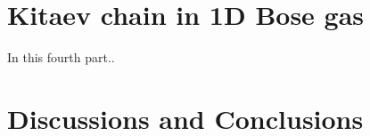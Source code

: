 \documentclass[11pt, twoside]{Thesis}
\begin{document}
 




\part{Kitaev chain in 1D Bose gas}
In this fourth part..
\newpage



\part{Discussions and Conclusions}
\newpage 






\appendix %









\backmatter


\label{Bibliography}

\printbibliography
\chead{}
 
\end{document}
